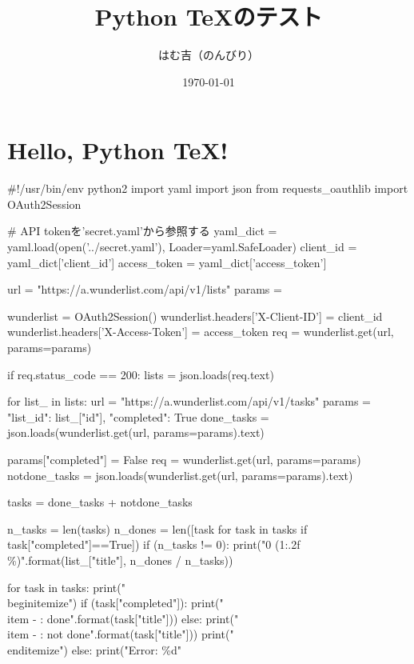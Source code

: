 \documentclass[a4j]{jsarticle}
\title{Python \TeX のテスト}
\author{はむ吉（のんびり）}
\date{\today}
\begin{document}
\maketitle
\section{Hello, Python \TeX !}
\begin{pycode}
#!/usr/bin/env python2
import yaml
import json
from requests_oauthlib import OAuth2Session

# API tokenを'secret.yaml'から参照する
yaml_dict = yaml.load(open('../secret.yaml'), Loader=yaml.SafeLoader)
client_id = yaml_dict['client_id']
access_token = yaml_dict['access_token']

url = "https://a.wunderlist.com/api/v1/lists"
params = {}

wunderlist = OAuth2Session()
wunderlist.headers['X-Client-ID'] = client_id
wunderlist.headers['X-Access-Token'] = access_token
req = wunderlist.get(url, params=params)

if req.status_code == 200:
    lists = json.loads(req.text)

    for list_ in lists:
        url = "https://a.wunderlist.com/api/v1/tasks"
        params = {
                "list_id": list_["id"],
                "completed": True
                }
        done_tasks = json.loads(wunderlist.get(url, params=params).text)

        params["completed"] = False
        req = wunderlist.get(url, params=params)
        notdone_tasks = json.loads(wunderlist.get(url, params=params).text)

        tasks = done_tasks + notdone_tasks

        n_tasks = len(tasks)
        n_dones = len([task for task in tasks if task["completed"]==True])
        if (n_tasks != 0):
            print("{0} ({1:.2f} \%)".format(list_["title"], n_dones / n_tasks))

        for task in tasks:
            print("\\begin{itemize}")
            if (task["completed"]):
                print("\\item - {}: done".format(task["title"]))
            else:
                print("\\item - {}: not done".format(task["title"]))
            print("\\end{itemize}")
else:
    print("Error: \%d" %
\end{pycode}
\end{document}
